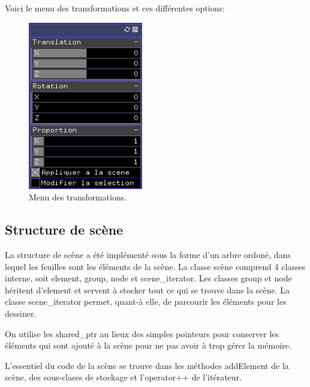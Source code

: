 Voici le menu des transformations et ces différentes options:\\
\begin{figure}[h]
	\centering
	\includegraphics[width=5cm]{fig/transformations.png}
	\caption{Menu des transformations.}
	\label{fig:transformations}
\end{figure}

\subsection{Structure de scène}
La structure de scène a été implémenté sous la forme d'un arbre ordoné, dans lequel les feuilles sont les éléments de la scène. La classe scène comprend 4 classes interne, soit element, group, node et scene\_iterator. Les classes group et node héritent d'element et  servent à stocker tout ce qui se trouve dans la scène. La classe scene\_iterator permet, quant-à elle, de parcourir les éléments pour les dessiner. 

On utilise les shared\_ptr au lieux des simples pointeurs pour conserver les éléments qui sont ajouté à la scène pour ne pas avoir à trop gérer la mémoire.

L'essentiel du code de la scène se trouve dans les méthodes addElement de la scène, des sous-clases de stockage et l'operator++ de l'itérateur.

